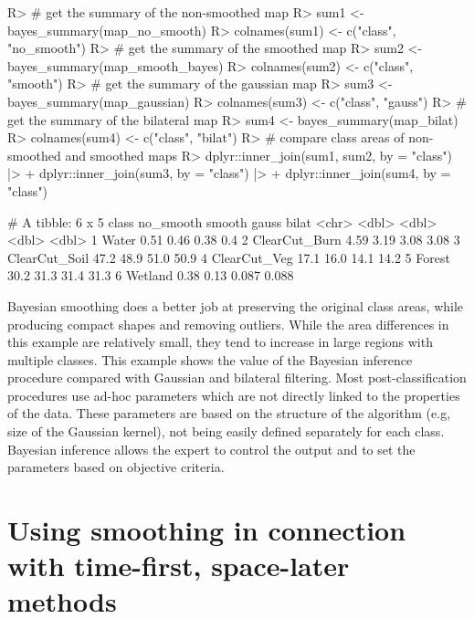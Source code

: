 \documentclass[
  shortnames]{jss}
\begin{document}
\begin{CodeChunk}
\begin{CodeInput}
R> # get the summary of the non-smoothed map
R> sum1 <- bayes_summary(map_no_smooth)
R> colnames(sum1) <- c("class", "no_smooth")
R> # get the summary of the smoothed map
R> sum2 <- bayes_summary(map_smooth_bayes)
R> colnames(sum2) <- c("class", "smooth")
R> # get the summary of the gaussian map
R> sum3 <- bayes_summary(map_gaussian)
R> colnames(sum3) <- c("class", "gauss")
R> # get the summary of the bilateral map
R> sum4 <- bayes_summary(map_bilat)
R> colnames(sum4) <- c("class", "bilat")
R> # compare class areas of non-smoothed and smoothed maps
R> dplyr::inner_join(sum1, sum2, by = "class") |> 
+   dplyr::inner_join(sum3, by = "class") |> 
+   dplyr::inner_join(sum4, by = "class") 
\end{CodeInput}
\begin{CodeOutput}
# A tibble: 6 x 5
  class         no_smooth smooth  gauss  bilat
  <chr>             <dbl>  <dbl>  <dbl>  <dbl>
1 Water              0.51   0.46  0.38   0.4  
2 ClearCut_Burn      4.59   3.19  3.08   3.08 
3 ClearCut_Soil     47.2   48.9  51.0   50.9  
4 ClearCut_Veg      17.1   16.0  14.1   14.2  
5 Forest            30.2   31.3  31.4   31.3  
6 Wetland            0.38   0.13  0.087  0.088
\end{CodeOutput}
\end{CodeChunk}

Bayesian smoothing does a better job at preserving the original class areas, while producing compact shapes and removing outliers. While the area differences in this example are relatively small, they tend to increase in large regions with multiple classes. This example shows the value of the Bayesian inference procedure compared with Gaussian and bilateral filtering. Most post-classification procedures use ad-hoc parameters which are not directly linked to the properties of the data. These parameters are based on the structure of the algorithm (e.g, size of the Gaussian kernel), not being easily defined separately for each class. Bayesian inference allows the expert to control the output and to set the parameters based on objective criteria.

\section{Using smoothing in connection with time-first, space-later methods}\label{using-smoothing-in-connection-with-time-first-space-later-methods}
\end{document}
